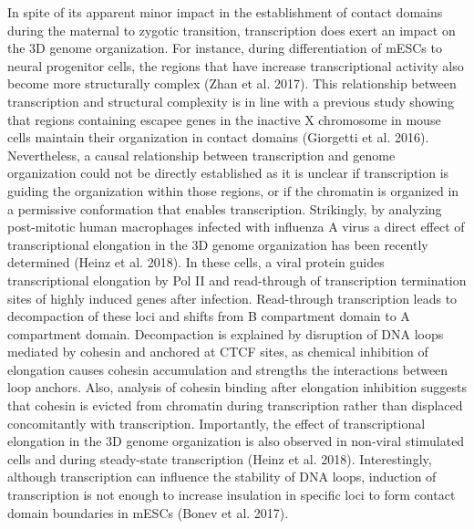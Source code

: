In spite of its apparent minor impact in the establishment of contact domains during the maternal to zygotic transition, transcription does exert an impact on the 3D genome organization. For instance, during differentiation of mESCs to neural progenitor cells, the regions that have increase transcriptional activity also become more structurally complex (Zhan et al. 2017). This relationship between transcription and structural complexity is in line with a previous study showing that regions containing escapee genes in the inactive X chromosome in mouse cells maintain their organization in contact domains (Giorgetti et al. 2016). Nevertheless, a causal relationship between transcription and genome organization could not be directly established as it is unclear if transcription is guiding the organization within those regions, or if the chromatin is organized in a permissive conformation that enables transcription. Strikingly, by analyzing post-mitotic human macrophages infected with influenza A virus a direct effect of transcriptional elongation in the 3D genome organization has been recently determined (Heinz et al. 2018). In these cells, a viral protein guides transcriptional elongation by Pol II and read-through of transcription termination sites of highly induced genes after infection. Read-through transcription leads to decompaction of these loci and shifts from B compartment domain to A compartment domain. Decompaction is explained by disruption of DNA loops mediated by cohesin and anchored at CTCF sites, as chemical inhibition of elongation causes cohesin accumulation and strengths the interactions between loop anchors. Also, analysis of cohesin binding after elongation inhibition suggests that cohesin is evicted from chromatin during transcription rather than displaced concomitantly with transcription. Importantly, the effect of transcriptional elongation in the 3D genome organization is also observed in non-viral stimulated cells and during steady-state transcription (Heinz et al. 2018). Interestingly, although transcription can influence the stability of DNA loops, induction of transcription is not enough to increase insulation in specific loci to form contact domain boundaries in mESCs (Bonev et al. 2017).\\

